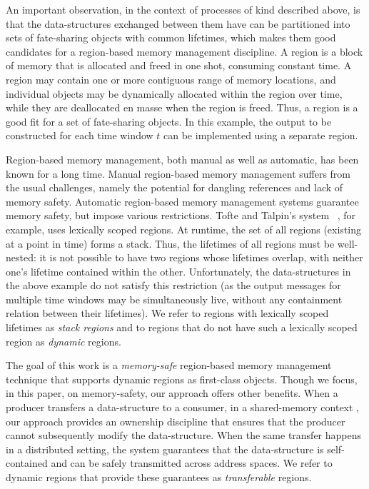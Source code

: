 An important observation, in the context of processes of kind
described above, is that the data-structures exchanged between them
have can be partitioned into sets of fate-sharing objects with common
lifetimes, which makes them good candidates for a region-based memory
management discipline. A region is a block of memory that is allocated
and freed in one shot, consuming constant time. A region may contain
one or more contiguous range of memory locations, and individual
objects may be dynamically allocated within the region over time,
while they are deallocated en masse when the region is freed.  Thus, a
region is a good fit for a set of fate-sharing objects.
In this example, the output to be constructed for each time window $t$
can be implemented using a separate region.

Region-based memory management, both manual as well as automatic, has
been known for a long time. Manual region-based memory management
suffers from the usual challenges, namely the potential for dangling
references and lack of memory safety. Automatic region-based memory
management systems guarantee memory safety, but impose various
restrictions.  Tofte and Talpin's system~\cite{tofte94,tofte97} , for
example, uses lexically scoped regions.  At runtime, the set of all
regions (existing at a point in time) forms a stack. Thus, the
lifetimes of all regions must be well-nested: it is not possible to
have two regions whose lifetimes overlap, with neither one's lifetime
contained within the other.  Unfortunately, the data-structures in the
above example do not satisfy this restriction (as the output messages
for multiple time windows may be simultaneously live, without any
containment relation between their lifetimes).  We refer to regions
with lexically scoped lifetimes as \emph{stack regions} and to regions
that do not have such a lexically scoped region as \emph{dynamic}
regions.

The goal of this work is a \emph{memory-safe} region-based memory
management technique that supports dynamic regions as first-class
objects. Though we focus, in this paper, on memory-safety, our
approach offers other benefits.  When a producer transfers a
data-structure to a consumer, in a shared-memory context , our
approach provides an ownership discipline that ensures that the
producer cannot subsequently modify the data-structure. When the same
transfer happens in a distributed setting, the system guarantees that
the data-structure is self-contained and can be safely transmitted
across address spaces.  We refer to dynamic regions that provide these
guarantees as \emph{transferable} regions.

